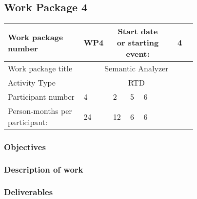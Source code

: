 \subsection{Work Package 4}

\begin{table}[hbpt]\centering
	\begin{tabular}{|p{0.35\linewidth}|p{0.06\linewidth}|p{0.06\linewidth}|p{0.06\linewidth}|
         p{0.06\linewidth}|p{0.06\linewidth}|p{0.06\linewidth}|p{0.06\linewidth}|}\hline
		 Work package number& WP4 &
		 \multicolumn{4}{|c|}{Start date or starting event:}{}&
		 \multicolumn{2}{|c|}{                        4 }{}\\\hline
		 Work package title&\multicolumn{7}{|c|}{Semantic Analyzer}{}\\\hline
		 Activity Type&\multicolumn{7}{|c|}{ RTD }{}\\\hline
		 Participant number & 4 & 2 & 5 & 6 & ~ & ~ & ~ \\\hline
		 Person-months per participant: & 24 & 12 & 6 & 6 & ~ & ~ & ~ \\\hline
	\end{tabular}
\end{table}

\subsubsection{Objectives}

\subsubsection{Description of work}

\subsubsection{Deliverables}